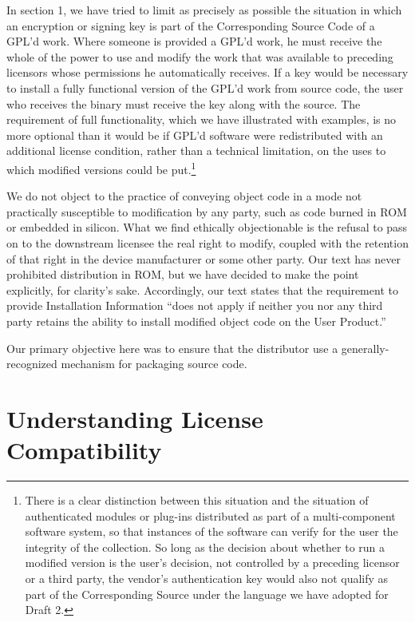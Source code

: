 In section 1, we have tried to limit as precisely as possible the situation
in which an encryption or signing key is part of the Corresponding Source
Code of a GPL'd work.  Where someone is provided a GPL'd work, he must
receive the whole of the power to use and modify the work that was available
to preceding licensors whose permissions he automatically receives.  If a key
would be necessary to install a fully functional version of the GPL'd work
from source code, the user who receives the binary must receive the key along
with the source.  The requirement of full functionality, which we have
illustrated with examples, is no more optional than it would be if GPL'd
software were redistributed with an additional license condition, rather than
a technical limitation, on the uses to which modified versions could be
put.\footnote{There is a clear distinction between this situation and the
  situation of authenticated modules or plug-ins distributed as part of a
  multi-component software system, so that instances of the software can
  verify for the user the integrity of the collection.  So long as the
  decision about whether to run a modified version is the user's decision,
  not controlled by a preceding licensor or a third party, the vendor's
  authentication key would also not qualify as part of the Corresponding
  Source under the language we have adopted for Draft 2.}


We do not object to the practice of conveying object code in a mode not
practically susceptible to modification by any party, such as code burned in
ROM or embedded in silicon.  What we find ethically objectionable is the
refusal to pass on to the downstream licensee the real right to modify,
coupled with the retention of that right in the device manufacturer or some
other party.  Our text has never prohibited distribution in ROM, but we have
decided to make the point explicitly, for clarity's sake. Accordingly, our
text states that the requirement to provide Installation Information ``does
not apply if neither you nor any third party retains the ability to install
modified object code on the User Product.''


Our primary objective here was to ensure that the
distributor use a generally-recognized mechanism for packaging source
code.

\section{Understanding License Compatibility}
\label{license-compatibility}

